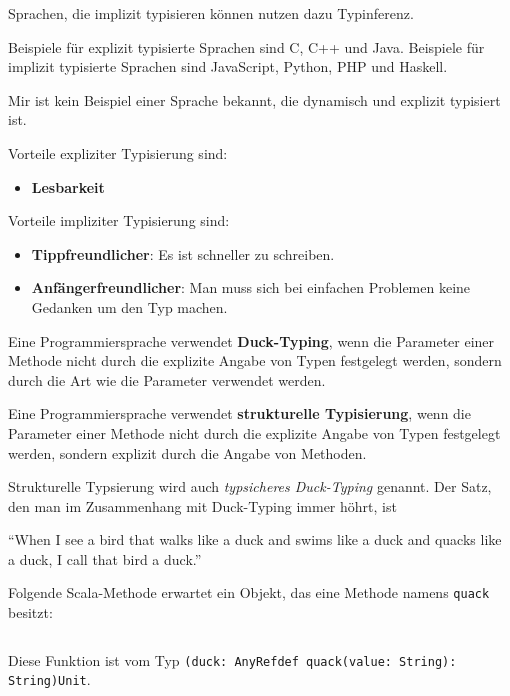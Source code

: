 Sprachen, die implizit typisieren können nutzen dazu Typinferenz.

Beispiele für explizit typisierte Sprachen sind C, C++ und Java.
Beispiele für implizit typisierte Sprachen sind JavaScript, Python, PHP und Haskell.

Mir ist kein Beispiel einer Sprache bekannt, die dynamisch und explizit typisiert
ist.

Vorteile expliziter Typisierung sind:

\begin{itemize}
    \item \textbf{Lesbarkeit}
\end{itemize}

Vorteile impliziter Typisierung sind:

\begin{itemize}
    \item \textbf{Tippfreundlicher}: Es ist schneller zu schreiben.
    \item \textbf{Anfängerfreundlicher}: Man muss sich bei einfachen Problemen
          keine Gedanken um den Typ machen.
\end{itemize}

\begin{definition}%
    \begin{defenum}
        \item Eine Programmiersprache verwendet \textbf{Duck-Typing}, wenn die Parameter einer
              Methode nicht durch die explizite Angabe von Typen festgelegt werden, sondern
              durch die Art wie die Parameter verwendet werden.
        \item Eine Programmiersprache verwendet \textbf{strukturelle Typisierung}, wenn die
              Parameter einer Methode nicht durch die explizite Angabe von Typen
              festgelegt werden, sondern explizit durch die Angabe von Methoden.
    \end{defenum}
\end{definition}

Strukturelle Typsierung wird auch \textit{typsicheres Duck-Typing} genannt.
Der Satz, den man im Zusammenhang mit Duck-Typing immer höhrt, ist

\enquote{When I see a bird that walks like a duck and swims like a duck and quacks like a duck, I call that bird a duck.}

\begin{beispiel}
    Folgende Scala-Methode erwartet ein Objekt, das eine Methode namens \texttt{quack}
    besitzt:

    \inputminted[numbersep=5pt, tabsize=4]{scala}{scripts/scala/duck-typing-example.scala}

    Diese Funktion ist vom Typ \texttt{(duck: AnyRef{def quack(value: String): String})Unit}.
\end{beispiel}


